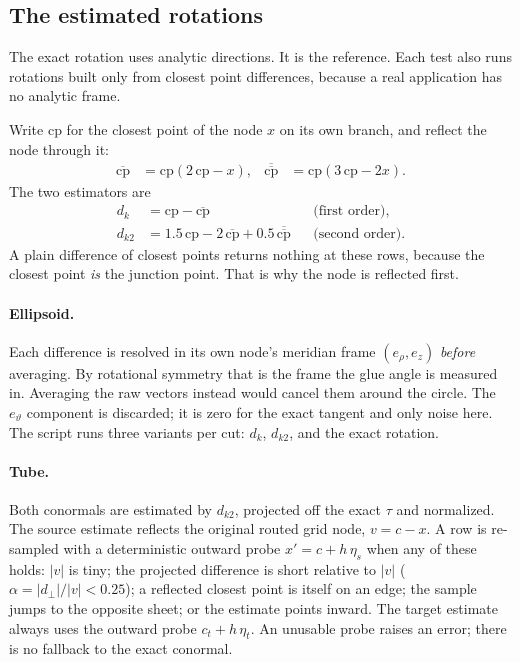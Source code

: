 \subsection{The estimated rotations}

The exact rotation uses analytic directions. It is the reference. Each
test also runs rotations built only from closest point differences,
because a real application has no analytic frame.

Write $\mathrm{cp}$ for the closest point of the node $x$ on its own
branch, and reflect the node through it:
\begin{align}
  \overline{\mathrm{cp}} &= \mathrm{cp}(2\,\mathrm{cp}-x), &
  \overline{\overline{\mathrm{cp}}} &= \mathrm{cp}(3\,\mathrm{cp}-2x) .
\end{align}
The two estimators are
\begin{align}
  d_k   &= \mathrm{cp} - \overline{\mathrm{cp}}
           &&\text{(first order)}, \\
  d_{k2} &= 1.5\,\mathrm{cp} - 2\,\overline{\mathrm{cp}}
            + 0.5\,\overline{\overline{\mathrm{cp}}}
           &&\text{(second order)} .
\end{align}
A plain difference of closest points returns nothing at these rows,
because the closest point \emph{is} the junction point. That is why the
node is reflected first.

\paragraph{Ellipsoid.} Each difference is resolved in its own node's
meridian frame $(e_\rho,e_z)$ \emph{before} averaging. By rotational
symmetry that is the frame the glue angle is measured in. Averaging the
raw vectors instead would cancel them around the circle. The
$e_\vartheta$ component is discarded; it is zero for the exact tangent
and only noise here. The script runs three variants per cut: $d_k$,
$d_{k2}$, and the exact rotation.

\paragraph{Tube.} Both conormals are estimated by $d_{k2}$, projected off
the exact $\tau$ and normalized. The source estimate reflects the
original routed grid node, $v = c-x$. A row is re-sampled with a
deterministic outward probe $x' = c + h\,\eta_s$ when any of these holds:
$|v|$ is tiny; the projected difference is short relative to $|v|$
($\alpha = |d_\perp|/|v| < 0.25$); a reflected closest point is itself on
an edge; the sample jumps to the opposite sheet; or the estimate points
inward. The target estimate always uses the outward probe
$c_t + h\,\eta_t$. An unusable probe raises an error; there is no
fallback to the exact conormal.

